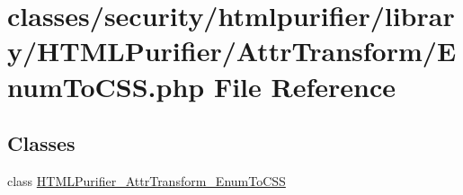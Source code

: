 \hypertarget{EnumToCSS_8php}{\section{classes/security/htmlpurifier/library/\+H\+T\+M\+L\+Purifier/\+Attr\+Transform/\+Enum\+To\+C\+S\+S.php File Reference}
\label{EnumToCSS_8php}
}
\subsection*{Classes}
\begin{DoxyCompactItemize}
\item 
class \hyperlink{classHTMLPurifier__AttrTransform__EnumToCSS}{H\+T\+M\+L\+Purifier\+\_\+\+Attr\+Transform\+\_\+\+Enum\+To\+C\+S\+S}
\end{DoxyCompactItemize}
